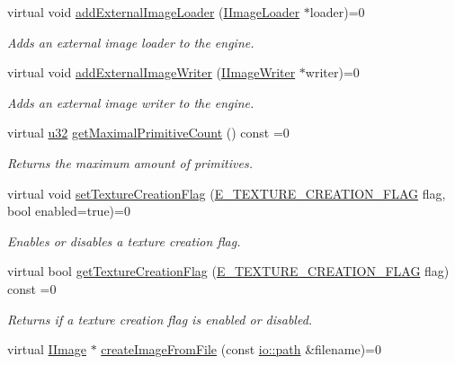 \begin{DoxyCompactItemize}
virtual void \hyperlink{classirr_1_1video_1_1IVideoDriver_a9479ae15f0e26eaaf15c9420ff289b6d}{add\+External\+Image\+Loader} (\hyperlink{classirr_1_1video_1_1IImageLoader}{I\+Image\+Loader} $\ast$loader)=0
\begin{DoxyCompactList}\small\item\em Adds an external image loader to the engine. \end{DoxyCompactList}\item 
virtual void \hyperlink{classirr_1_1video_1_1IVideoDriver_a56160e0d88346e04db921fbe4635a7ae}{add\+External\+Image\+Writer} (\hyperlink{classirr_1_1video_1_1IImageWriter}{I\+Image\+Writer} $\ast$writer)=0
\begin{DoxyCompactList}\small\item\em Adds an external image writer to the engine. \end{DoxyCompactList}\item 
virtual \hyperlink{namespaceirr_a0416a53257075833e7002efd0a18e804}{u32} \hyperlink{classirr_1_1video_1_1IVideoDriver_afd93e778fac79f7863da72a50e720f88}{get\+Maximal\+Primitive\+Count} () const =0
\begin{DoxyCompactList}\small\item\em Returns the maximum amount of primitives. \end{DoxyCompactList}\item 
virtual void \hyperlink{classirr_1_1video_1_1IVideoDriver_a868b58a6b86b9e4841ca3879ce246c4e}{set\+Texture\+Creation\+Flag} (\hyperlink{namespaceirr_1_1video_acaf6f7414534f7d62bff18c5bf11876f}{E\+\_\+\+T\+E\+X\+T\+U\+R\+E\+\_\+\+C\+R\+E\+A\+T\+I\+O\+N\+\_\+\+F\+L\+AG} flag, bool enabled=true)=0
\begin{DoxyCompactList}\small\item\em Enables or disables a texture creation flag. \end{DoxyCompactList}\item 
virtual bool \hyperlink{classirr_1_1video_1_1IVideoDriver_ae64d474cbca38f64f2dbb8fcacb1a035}{get\+Texture\+Creation\+Flag} (\hyperlink{namespaceirr_1_1video_acaf6f7414534f7d62bff18c5bf11876f}{E\+\_\+\+T\+E\+X\+T\+U\+R\+E\+\_\+\+C\+R\+E\+A\+T\+I\+O\+N\+\_\+\+F\+L\+AG} flag) const =0
\begin{DoxyCompactList}\small\item\em Returns if a texture creation flag is enabled or disabled. \end{DoxyCompactList}\item 
virtual \hyperlink{classirr_1_1video_1_1IImage}{I\+Image} $\ast$ \hyperlink{classirr_1_1video_1_1IVideoDriver_ac5b4c13f64d96d27fa27f52b68f77b8c}{create\+Image\+From\+File} (const \hyperlink{namespaceirr_1_1io_ab1bdc45edb3f94d8319c02bc0f840ee1}{io\+::path} \&filename)=0

\end{DoxyCompactItemize}
